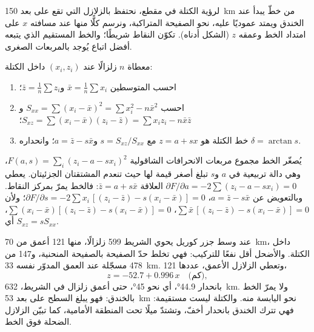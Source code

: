 لرؤية الكتلة في مقطع، نحتفظ بالزلازل التي تقع على بعد \qty{150}{km} من خطّ يبدأ عند الخندق ويمتد عموديًا عليه، نحو الصفيحة المتراكبة، ونرسم كلًّا منها عند مسافته $x$ على امتداد الخط وعمقه $z$ (الشكل أدناه). تكوّن النقاط شريطًا؛ والخط المستقيم الذي يتبعه أفضل اتباع يُوجد بالمربعات الصغرى.

\begin{method}\label{met:b1:active-margins:lsq}
معطاة $n$ زلزالًا عند $(x_i, z_i)$ داخل الكتلة:
\begin{enumerate}
  \item احسب المتوسطين $\bar x = \frac1n\sum x_i$ و$\bar z = \frac1n\sum z_i$؛
  \item احسب $S_{xx} = \sum (x_i - \bar x)^2 = \sum x_i^2 - n\bar x^2$ و
        $S_{xz} = \sum (x_i - \bar x)(z_i - \bar z) = \sum x_i z_i - n\bar x\bar z$؛
  \item خط الكتلة هو $z = a + s x$ مع $s = S_{xz}/S_{xx}$ و$a = \bar z - s\bar x$؛ وانحداره $\delta = \arctan s$.
\end{enumerate}
\end{method}

يُصغّر الخط مجموع مربعات الانحرافات الشاقولية $F(a, s) = \sum_i (z_i - a - s x_i)^2$، وهي دالة تربيعية في $a$ و$s$ تبلغ أصغر قيمة لها حيث تنعدم المشتقتان الجزئيتان. يعطي $\partial F/\partial a =
-2\sum (z_i - a - s x_i) = 0$ العلاقة $\bar z = a + s\bar x$: فالخط يمرّ بمركز النقاط. وبالتعويض عن $a = \bar z - s\bar x$،
$\partial F/\partial s = -2\sum x_i\,[(z_i - \bar z) - s(x_i - \bar x)] = 0$؛ ولأن $\sum \bar x\,[(z_i - \bar z) - s(x_i - \bar x)] = 0$،
$\sum (x_i - \bar x)[(z_i - \bar z) - s(x_i - \bar x)] = 0$، أي
$S_{xz} = s S_{xx}$.

عند وسط جزر كوريل يحوي الشريط 599 زلزالًا، منها 121 أعمق من \qty{70}{km}، داخل الكتلة. والأضحل أقل نفعًا للتركيب: فهي تخلط حدّ الصفيحة بالصفيحة المنحنية، و\num{147} من 478 مسجّلة عند العمق المدوّر نفسه \qty{33}{km}. وتعطي الزلازل الأعمق، عددها 121،
\[
  z = -52.7 + 0.996\,x \quad\text{(كم)},
\]
بانحدار \ang{44.9}، أي نحو \ang{45}، حتى أعمق زلزال في الشريط، \qty{632}{km}. ولا يمرّ الخط بالخندق: فهو يبلغ السطح على بعد \qty{53}{km} نحو اليابسة منه. والكتلة ليست مستقيمة: فهي تترك الخندق بانحدار أخفّ، وتشتدّ ميلًا تحت المنطقة الأمامية، كما تبيّن الزلازل الضحلة فوق الخط.

